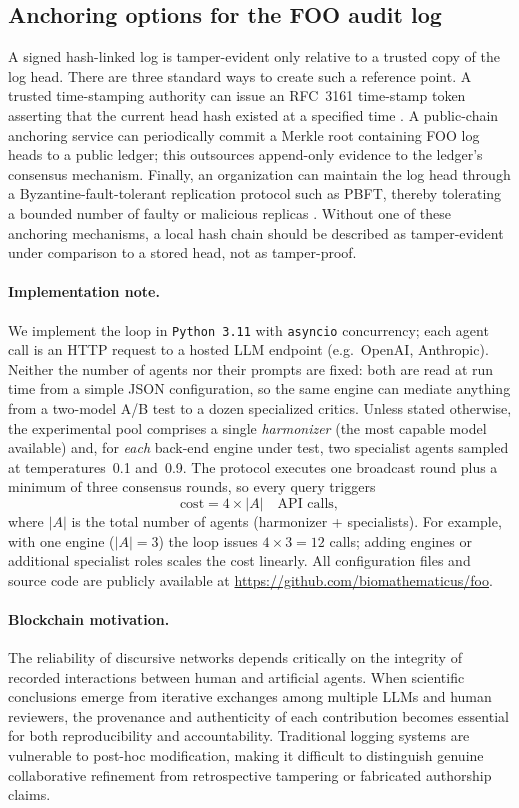 \documentclass[12pt]{article}
\theoremstyle{definition}
\begin{document}
\subsection{Anchoring options for the FOO audit log}
\label{app:anchoring}

A signed hash-linked log is tamper-evident only relative to a trusted copy of
the log head.  There are three standard ways to create such a reference point.
A trusted time-stamping authority can issue an RFC~3161 time-stamp token
asserting that the current head hash existed at a specified time
\parencite{rfc3161}.  A public-chain anchoring service can periodically commit a
Merkle root containing FOO log heads to a public ledger; this outsources
append-only evidence to the ledger's consensus mechanism.  Finally, an
organization can maintain the log head through a Byzantine-fault-tolerant
replication protocol such as PBFT, thereby tolerating a bounded number of faulty
or malicious replicas \parencite{castro1999pbft}.  Without one of these
anchoring mechanisms, a local hash chain should be described as tamper-evident
under comparison to a stored head, not as tamper-proof.

\paragraph{Implementation note.}
We implement the loop in \texttt{Python~3.11} with \texttt{asyncio} concurrency; each agent call is an HTTP request to a hosted LLM endpoint (e.g.\ OpenAI, Anthropic).   Neither the number of agents nor their prompts are fixed: both are read at run time from a simple JSON configuration, so the same engine can mediate anything from a two-model A/B test to a dozen specialized critics.  Unless stated otherwise, the experimental pool comprises a single \emph{harmonizer} (the most capable model available) and, for \emph{each} back-end engine under test, two specialist agents sampled at temperatures~0.1 and~0.9.  The protocol executes one broadcast round plus a minimum of three consensus rounds, so every query triggers
\[
\text{cost} = 4 \times |A| \quad \text{API calls},
\]
where \(|A|\) is the total number of agents (harmonizer + specialists).
For example, with one engine (\(|A|=3\)) the loop issues
\(4\times3 = 12\) calls; adding engines or additional specialist roles
scales the cost linearly.  
All configuration files and source code are publicly available at
\url{https://github.com/biomathematicus/foo}.


\paragraph{Blockchain motivation.} 
The reliability of discursive networks depends critically on the integrity of recorded interactions between human and artificial agents. When scientific conclusions emerge from iterative exchanges among multiple LLMs and human reviewers, the provenance and authenticity of each contribution becomes essential for both reproducibility and accountability. Traditional logging systems are vulnerable to post-hoc modification, making it difficult to distinguish genuine collaborative refinement from retrospective tampering or fabricated authorship claims.
\end{document}
